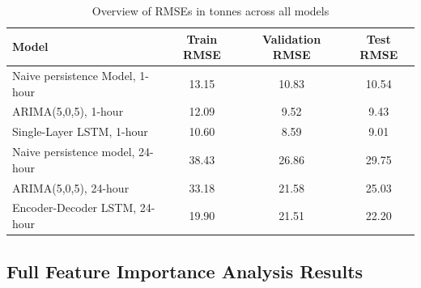 \vspace{1cm}

\begin{table}[ht]
    \centering
    \begin{tabular}{lccc}
        \hline
        \textbf{Model}                   & \textbf{Train RMSE} & \textbf{Validation RMSE} & \textbf{Test RMSE} \\ \hline
        Naive persistence Model, 1-hour  & 13.15               & 10.83                    & 10.54              \\
        ARIMA(5,0,5), 1-hour             & 12.09               & \phantom{0}9.52          & \phantom{0}9.43    \\
        Single-Layer LSTM, 1-hour        & 10.60               & \phantom{0}8.59          & \phantom{0}9.01    \\
        Naive persistence model, 24-hour & 38.43               & 26.86                    & 29.75              \\
        ARIMA(5,0,5), 24-hour            & 33.18               & 21.58                    & 25.03              \\
        Encoder-Decoder LSTM, 24-hour    & 19.90               & 21.51                    & 22.20              \\ \hline
    \end{tabular}
    \caption{Overview of RMSEs in tonnes \cotwoe{} across all models}
    \label{tab:overview-rmse-across-models}
\end{table}

\clearpage

\thispagestyle{plain}
\subsection{Full Feature Importance Analysis Results}
\label{apdx:full-feature-importance-analysis-results}

